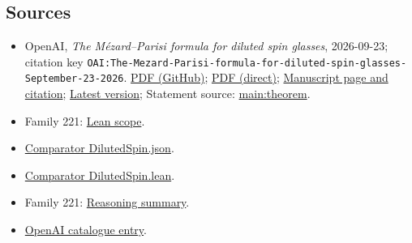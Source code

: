 \documentclass[11pt]{article}
\begin{document}
\subsection{Sources}
\begin{itemize}
\item OpenAI, \emph{The Mézard–Parisi formula for diluted spin glasses}, 2026-09-23; citation key \texttt{OAI:The-Mezard-Parisi-formula-for-diluted-spin-glasses-September-23-2026}. \href{https://github.com/openai/math/blob/adc7f1241b42e322a6451854ab7e4b4c146bf78a/preprints/The-Mezard-Parisi-formula-for-diluted-spin-glasses-September-23-2026/paper.pdf}{PDF (GitHub)}; \href{https://github.com/openai/math/raw/adc7f1241b42e322a6451854ab7e4b4c146bf78a/preprints/The-Mezard-Parisi-formula-for-diluted-spin-glasses-September-23-2026/paper.pdf}{PDF (direct)}; \href{https://github.com/openai/math/blob/adc7f1241b42e322a6451854ab7e4b4c146bf78a/preprints/The-Mezard-Parisi-formula-for-diluted-spin-glasses-September-23-2026/README.md}{Manuscript page and citation}; \href{https://github.com/openai/math/blob/main/preprints/The-Mezard-Parisi-formula-for-diluted-spin-glasses-September-23-2026/paper.pdf}{Latest version}; Statement source: \href{https://github.com/openai/math/blob/adc7f1241b42e322a6451854ab7e4b4c146bf78a/preprints/The-Mezard-Parisi-formula-for-diluted-spin-glasses-September-23-2026/build/sections/model.tex\#L130}{main:theorem}.
\item Family 221: \href{https://github.com/openai/math/blob/adc7f1241b42e322a6451854ab7e4b4c146bf78a/lean/docs/221.md}{Lean scope}.
\item \href{https://github.com/openai/math/blob/adc7f1241b42e322a6451854ab7e4b4c146bf78a/lean/ComparatorChallenges/DilutedSpin.json}{Comparator DilutedSpin.json}.
\item \href{https://github.com/openai/math/blob/adc7f1241b42e322a6451854ab7e4b4c146bf78a/lean/ComparatorChallenges/DilutedSpin.lean}{Comparator DilutedSpin.lean}.
\item Family 221: \href{https://github.com/openai/math/blob/adc7f1241b42e322a6451854ab7e4b4c146bf78a/reasoning\_traces/mezard-parisi-formula.pdf}{Reasoning summary}.
\item \href{https://github.com/openai/math/blob/adc7f1241b42e322a6451854ab7e4b4c146bf78a/CONTENTS.md}{OpenAI catalogue entry}.
\end{itemize}
\end{document}
